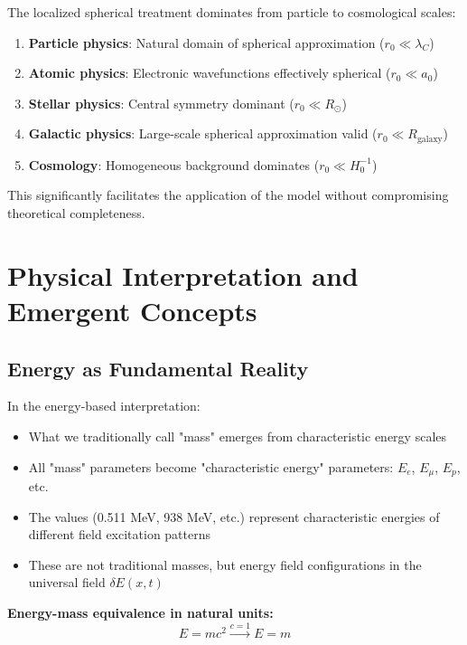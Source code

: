 \documentclass[12pt,a4paper]{report}
\newcommand{\rzero}{r_0}                  %
\begin{document}
The localized spherical treatment dominates from particle to cosmological scales:
\begin{enumerate}
	\item \textbf{Particle physics}: Natural domain of spherical approximation ($\rzero \ll \lambda_C$)
	\item \textbf{Atomic physics}: Electronic wavefunctions effectively spherical ($\rzero \ll a_0$)
	\item \textbf{Stellar physics}: Central symmetry dominant ($\rzero \ll R_{\odot}$)
	\item \textbf{Galactic physics}: Large-scale spherical approximation valid ($\rzero \ll R_{\text{galaxy}}$)
	\item \textbf{Cosmology}: Homogeneous background dominates ($\rzero \ll H_0^{-1}$)
\end{enumerate}

This significantly facilitates the application of the model without compromising theoretical completeness.

\section{Physical Interpretation and Emergent Concepts}
\label{sec:physical_interpretation}

\subsection{Energy as Fundamental Reality}
\label{subsec:energy_fundamental}

In the energy-based interpretation:
\begin{itemize}
	\item What we traditionally call "mass" emerges from characteristic energy scales
	\item All "mass" parameters become "characteristic energy" parameters: $E_e$, $E_\mu$, $E_p$, etc.
	\item The values (0.511 MeV, 938 MeV, etc.) represent characteristic energies of different field excitation patterns
	\item These are not traditional masses, but energy field configurations in the universal field $\delta E(x,t)$
\end{itemize}

\textbf{Energy-mass equivalence in natural units:}
\begin{equation}
	E = mc^2 \xrightarrow{c=1} E = m
\end{equation}
\end{document}
